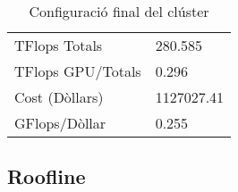 \begin{table}[H]
\begin{adjustwidth}{-1.0in}{-1.0in}
\begin{center}
\begin{tabular}{l|l}
{\cellcolor[HTML]{EFEFEF}TFlops Totals}             & {\cellcolor[HTML]{EFEFEF}280.585}                   \\ 
{\color[HTML]{000000}TFlops GPU/Totals}         & {\color[HTML]{000000} 0.296}                    \\ 
{\cellcolor[HTML]{EFEFEF}Cost (Dòllars)}                 & {\cellcolor[HTML]{EFEFEF}1127027.41}              \\
{\color[HTML]{000000}GFlops/Dòllar}               & {\color[HTML]{000000}0.255}                    \\ \hline
\end{tabular}
\caption{Configuració final del clúster}
\end{center}
\end{adjustwidth}
\end{table}




\subsection{Roofline}



